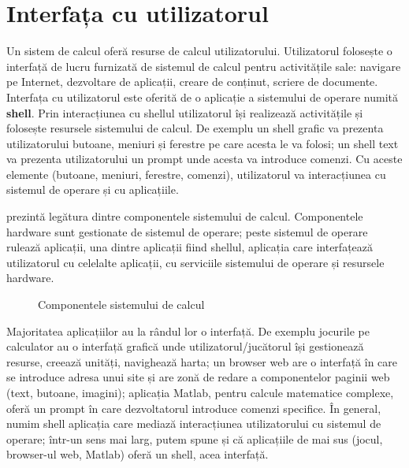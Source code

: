 \chapter{Interfața cu utilizatorul}
\label{chapter:ui}

Un sistem de calcul oferă resurse de calcul utilizatorului. Utilizatorul folosește o interfață de lucru furnizată de sistemul de calcul pentru activitățile sale: navigare pe Internet, dezvoltare de aplicații, creare de conținut, scriere de documente. Interfața cu utilizatorul este oferită de o aplicație a sistemului de operare numită \textbf{shell}. Prin interacțiunea cu shellul utilizatorul își realizează activitățile și folosește resursele sistemului de calcul. De exemplu un shell grafic va prezenta utilizatorului butoane, meniuri și ferestre pe care acesta le va folosi; un shell text va prezenta utilizatorului un prompt unde acesta va introduce comenzi. Cu aceste elemente (butoane, meniuri, ferestre, comenzi), utilizatorul va interacțiunea cu sistemul de operare și cu aplicațiile.

 prezintă legătura dintre componentele sistemului de calcul. Componentele hardware sunt gestionate de sistemul de operare; peste sistemul de operare rulează aplicații, una dintre aplicații fiind shellul, aplicația care interfațează utilizatorul cu celelalte aplicații, cu serviciile sistemului de operare și resursele hardware.

\begin{figure}[htbp]
  \centering
  \def\svgwidth{\columnwidth}
  
  \caption{Componentele sistemului de calcul}
  \label{fig:ui:system-components}
\end{figure}

Majoritatea aplicațiilor au la rândul lor o interfață. De exemplu jocurile pe calculator au o interfață grafică unde utilizatorul/jucătorul își gestionează resurse, creează unități, navighează harta; un browser web are o interfață în care se introduce adresa unui site și are zonă de redare a componentelor paginii web (text, butoane, imagini); aplicația Matlab, pentru calcule matematice complexe, oferă un prompt în care dezvoltatorul introduce comenzi specifice. În general, numim shell aplicația care mediază interacțiunea utilizatorului cu sistemul de operare; într-un sens mai larg, putem spune și că aplicațiile de mai sus (jocul, browser-ul web, Matlab) oferă un shell, acea interfață.


